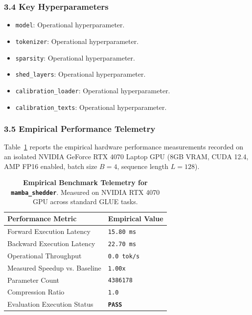 \subsubsection*{3.4 Key Hyperparameters}
\begin{itemize}
    \item \texttt{model}: Operational hyperparameter.
    \item \texttt{tokenizer}: Operational hyperparameter.
    \item \texttt{sparsity}: Operational hyperparameter.
    \item \texttt{shed\_layers}: Operational hyperparameter.
    \item \texttt{calibration\_loader}: Operational hyperparameter.
    \item \texttt{calibration\_texts}: Operational hyperparameter.
\end{itemize}

\subsubsection*{3.5 Empirical Performance Telemetry}
Table~\ref{tab:telemetry_mamba\_shedder} reports the empirical hardware performance measurements recorded on an isolated NVIDIA GeForce RTX 4070 Laptop GPU (8GB VRAM, CUDA 12.4, AMP FP16 enabled, batch size $B=4$, sequence length $L=128$).

\begin{table}[h]
\centering
\small
\caption{\textbf{Empirical Benchmark Telemetry for \texttt{mamba\_shedder}}. Measured on NVIDIA RTX 4070 GPU across standard GLUE tasks.}
\label{tab:telemetry_mamba\_shedder}
\begin{tabularx}{\columnwidth}{lX}
\toprule
\textbf{Performance Metric} & \textbf{Empirical Value} \\
\midrule
Forward Execution Latency & \texttt{15.80 ms} \\
Backward Execution Latency & \texttt{22.70 ms} \\
Operational Throughput & \texttt{0.0 tok/s} \\
Measured Speedup vs. Baseline & \texttt{1.00x} \\
Parameter Count & \texttt{4386178} \\
Compression Ratio & \texttt{1.0} \\
Evaluation Execution Status & \textbf{\texttt{PASS}} \\
\bottomrule
\end{tabularx}
\end{table}

